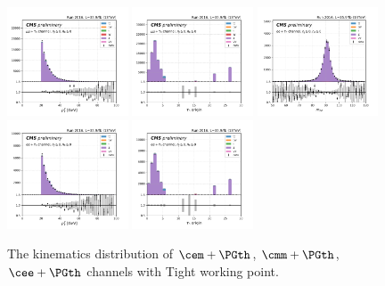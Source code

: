 \begin{figure}
    \includegraphics[width=0.32\textwidth]{chapters/Analysis/sectionCalibration/figures/jetToTauh/mumutau_tauPt_pickles_lltauTight.png}
    \includegraphics[width=0.32\textwidth]{chapters/Analysis/sectionCalibration/figures/jetToTauh/mumutau_tauGenFlavor_pickles_lltauTight.png}
    \includegraphics[width=0.32\textwidth]{chapters/Analysis/sectionCalibration/figures/jetToTauh/eetau_dilepton_mass_pickles_lltauTight.png}
    \includegraphics[width=0.32\textwidth]{chapters/Analysis/sectionCalibration/figures/jetToTauh/eetau_tauPt_pickles_lltauTight.png}
    \includegraphics[width=0.32\textwidth]{chapters/Analysis/sectionCalibration/figures/jetToTauh/eetau_tauGenFlavor_pickles_lltauTight.png}
    \caption{The kinematics distribution of $\cem+\PGth$, $\cmm+\PGth$, $\cee+\PGth$ channels with Tight \PGth working point.}
    \label{fig:analysis:calibration:llt_tight}
\end{figure}
